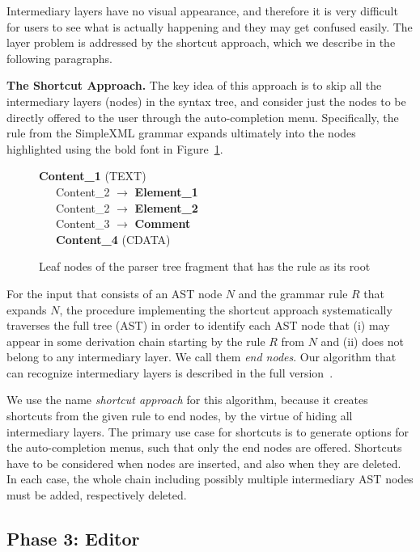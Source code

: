 Intermediary layers have no visual appearance, and therefore it is very difficult for users to see what is actually happening and they may get confused easily.
The layer problem is addressed by the shortcut approach, which we describe in the following paragraphs.

\noindent\textbf{The Shortcut Approach.}
The key idea of this approach is to skip all the intermediary layers (nodes) in the syntax tree, and consider just the nodes to be directly offered to the user through the auto-completion menu.
Specifically, the  rule from the SimpleXML grammar expands ultimately into the nodes highlighted using the bold font in Figure~\ref{fig:CONTENTEXPAND}.

\begin{figure}[ht]
\small
\textbf{Content{\_}1} (TEXT) \\
\ \ \ Content{\_}2 $\rightarrow$ \textbf{Element{\_}1} \\
\ \ \ Content{\_}2 $\rightarrow$ \textbf{Element{\_}2} \\
\ \ \ Content{\_}3 $\rightarrow$ \textbf{Comment} \\
\ \ \ \textbf{Content{\_}4} (CDATA)
\caption{Leaf nodes of the parser tree fragment that has the  rule as its root}
\label{fig:CONTENTEXPAND}
\vspace{-2mm}
\end{figure}

For the input that consists of an AST node $N$ and the grammar rule $R$ that expands $N$, the procedure implementing the shortcut approach systematically traverses the full tree (AST) in order to identify each AST node that (i) may appear in some derivation chain starting by the rule $R$ from $N$ and (ii) does not belong to any intermediary layer.
We call them \emph{end nodes}.
Our algorithm that can recognize intermediary layers is described in the full version~\cite{ref:TRFULL}.

We use the name \emph{shortcut approach} for this algorithm, because it creates shortcuts from the given rule to end nodes, by the virtue of hiding all intermediary layers.
The primary use case for shortcuts is to generate options for the auto-completion menus, such that only the end nodes are offered.
Shortcuts have to be considered when nodes are inserted, and also when they are deleted.
In each case, the whole chain including possibly multiple intermediary AST nodes must be added, respectively deleted.

\subsection{Phase 3: Editor}
\label{sect:EDITORDEF}

